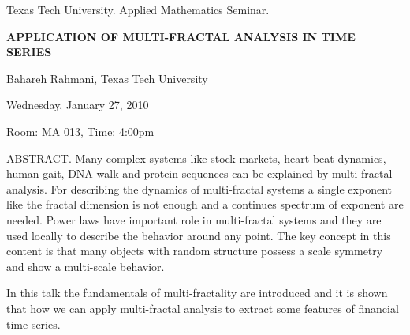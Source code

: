 \documentclass[oneside]{amsart}
\newcommand{\talktitle}{Application of Multi-Fractal Analysis in Time Series
}
\newcommand{\talkspeaker}{Bahareh Rahmani, Texas Tech University}
\newcommand{\talkdate}{Wednesday, January 27, 2010}
\newcommand{\talkabstract}{Many complex systems like stock markets, heart beat dynamics, human gait, DNA walk and protein sequences can be explained by multi-fractal analysis. For describing the dynamics of multi-fractal systems a single exponent like the fractal dimension is not enough and a continues spectrum of exponent are needed. Power laws have important role in multi-fractal systems and they are used locally to describe the behavior around any point.  The key concept in this content is that many objects with random structure possess a scale symmetry and show a multi-scale behavior.

In this talk the fundamentals of multi-fractality are introduced and  it is shown that how we can apply multi-fractal analysis to extract some features of financial time series.
}
\begin{document}
\thispagestyle{empty}

\begin{center}
Texas Tech University.  Applied Mathematics Seminar.

\end{center}

\begin{center}

\textbf{\LARGE {\uppercase{{\talktitle}}} }

\talkspeaker

\talkdate

Room: MA 013, Time: 4:00pm

\end{center}

ABSTRACT.
\talkabstract
\end{document}
